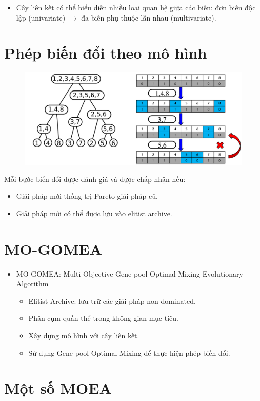 \documentclass{book}
\begin{document}
\begin{itemize}
    \item Cây liên kết có thể biểu diễn nhiều loại quan hệ giữa các biến: đơn biến độc lập (univariate) $\rightarrow$ đa biến phụ thuộc lẫn nhau (multivariate).
\end{itemize}

\section*{Phép biến đổi theo mô hình}

\begin{figure}[H]
    \centering
    \includegraphics[width=0.5\linewidth]{images/GA-7-8_75.png}
\end{figure}

Mỗi bước biến đổi được đánh giá và được chấp nhận nếu:
\begin{itemize}
    \item Giải pháp mới thống trị Pareto giải pháp cũ.
    \item Giải pháp mới có thể được lưu vào elitist archive.
\end{itemize}

\section*{MO-GOMEA}

\begin{itemize}
    \item MO-GOMEA: Multi-Objective Gene-pool Optimal Mixing Evolutionary Algorithm
    \begin{itemize}
        \item Elitist Archive: lưu trữ các giải pháp non-dominated.
        \item Phân cụm quần thể trong không gian mục tiêu.
        \item Xây dựng mô hình với cây liên kết.
        \item Sử dụng Gene-pool Optimal Mixing để thực hiện phép biến đổi.
    \end{itemize}
\end{itemize}

\section*{Một số MOEA}
\end{document}

